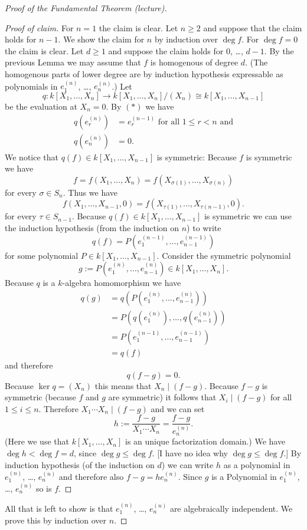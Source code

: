 \begin{proof}[Proof of the Fundamental Theorem (lecture)]
\begin{proof}[Proof of claim]
  For $n = 1$ the claim is clear. Let $n \geq 2$ and suppose that the claim holds for $n-1$. We show the claim for $n$ by induction over $\deg f$. For $\deg f = 0$ the claim is clear. Let $d \geq 1$ and suppose the claim holds for $0$, \dots, $d-1$. By the previous Lemma we may assume that $f$ is homogenous of degree $d$. (The homogenous parts of lower degree are by induction hypothesis expressable as polynomials in $e^{(n)}_1$, \dots, $e^{(n)}_n$.) Let
  \[
   q \colon k[X_1, \dotsc, X_n] \to k[X_1, \dotsc, X_n]/(X_n) \cong k[X_1, \dotsc, X_{n-1}]
  \]
  be the evaluation at $X_n = 0$. By $(\ast)$ we have
  \begin{align*}
   q\left( e^{(n)}_r \right) &= e^{(n-1)}_r \text{ for all } 1 \leq r < n \text{ and}\\
   q\left( e^{(n)}_n \right) &= 0.
  \end{align*}
  We notice that $q(f) \in k[X_1, \dotsc, X_{n-1}]$ is symmetric: Because $f$ is symmetric we have
  \[
   f = f(X_1, \dotsc, X_n) = f(X_{\sigma(1)}, \dotsc, X_{\sigma(n)})
  \]
  for every $\sigma \in S_n$. Thus we have
  \[
   f(X_1, \dotsc, X_{n-1}, 0) = f(X_{\tau(1)}, \dotsc, X_{\tau(n-1)}, 0).
  \]
  for every $\tau \in S_{n-1}$. Because $q(f) \in k[X_1, \dotsc, X_{n-1}]$ is symmetric we can use the induction hypothesis (from the induction on $n$) to write
  \[
   q(f) = P\left(e^{(n-1)}_1, \dotsc, e^{(n-1)}_{n-1}\right)
  \]
  for some polynomial $P \in k[X_1, \dotsc, X_{n-1}]$. Consider the symmetric polynomial
  \[
   g := P\left(e^{(n)}_1, \dotsc, e^{(n)}_{n-1}\right) \in k[X_1, \dotsc, X_n].
  \]
  Because $q$ is a $k$-algebra homomorphism we have
  \begin{align*}
   q(g)
   &= q\left( P\left(e^{(n)}_1, \dotsc, e^{(n)}_{n-1}\right) \right) \\
   &= P\left( q\left(e^{(n)}_1\right), \dotsc, q\left(e^{(n)}_{n-1}\right) \right) \\
   &= P\left( e^{(n-1)}_1, \dotsc, e^{(n-1)}_{n-1} \right) \\
   &= q(f)
  \end{align*}
  and therefore
  \[
   q(f-g) = 0.
  \]
  Because $\ker q = (X_n)$ this means that $X_n \mid (f-g)$. Because $f-g$ is symmetric (because $f$ and $g$ are symmetric) it follows that $X_i \mid (f-g)$ for all $1 \leq i \leq n$. Therefore $X_1 \dotsm X_n \mid (f-g)$ and we can set
  \[
   h := \frac{f-g}{X_1 \dotsm X_n} = \frac{f-g}{e^{(n)}_n}.
  \]
  (Here we use that $k[X_1, \dotsc, X_n]$ is an unique factorization domain.) We have $\deg h < \deg f = d$, since $\deg g \leq \deg f$. [I have no idea why $\deg g \leq \deg f$.] By induction hypothesis (of the induction on $d$) we can write $h$ as a polynomial in $e^{(n)}_1$, \dots, $e^{(n)}_n$ and therefore also $f-g = h e^{(n)}_n$. Since $g$ is a Polynomial in $e^{(n)}_1$, \dots, $e^{(n)}_n$ so is $f$.
 \end{proof}
  All that is left to show is that $e^{(n)}_1$, \dots, $e^{(n)}_n$ are algebraically independent. We prove this by induction over $n$.
  

\end{proof}
